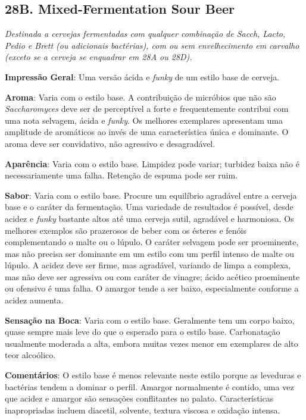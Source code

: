 \subsection*{28B. Mixed-Fermentation Sour Beer}
\textit{Destinada a cervejas fermentadas com qualquer combinação de Sacch, Lacto, Pedio e Brett (ou adicionais bactérias), com ou sem envelhecimento em carvalho (exceto se a cerveja se enquadrar em 28A ou 28D).}

\textbf{Impressão Geral}: Uma versão ácida e \textit{funky} de um estilo base de cerveja.

\textbf{Aroma}: Varia com o estilo base. A contribuição de micróbios que não são \textit{Saccharomyces} deve ser de perceptível a forte e frequentemente contribui com uma nota selvagem, ácida e \textit{funky}. Os melhores exemplares apresentam uma amplitude de aromáticos ao invés de uma característica única e dominante. O aroma deve ser convidativo, não agressivo e desagradável.

\textbf{Aparência}: Varia com o estilo base. Limpidez pode variar; turbidez baixa não é necessariamente uma falha. Retenção de espuma pode ser ruim.

\textbf{Sabor}: Varia com o estilo base. Procure um equilíbrio agradável entre a cerveja base e o caráter da fermentação. Uma variedade de resultados é possível, desde acidez e \textit{funky} bastante altos até uma cerveja sutil, agradável e harmoniosa. Os melhores exemplos são prazerosos de beber com os ésteres e fenóis complementando o malte ou o lúpulo. O caráter selvagem pode ser proeminente, mas não precisa ser dominante em um estilo com um perfil intenso de malte ou lúpulo. A acidez deve ser firme, mas agradável, variando de limpa a complexa, mas não deve ser agressiva ou com caráter de vinagre; ácido acético proeminente ou ofensivo é uma falha. O amargor tende a ser baixo, especialmente conforme a acidez aumenta.

\textbf{Sensação na Boca}: Varia com o estilo base. Geralmente tem um corpo baixo, quase sempre mais leve do que o esperado para o estilo base. Carbonatação usualmente moderada a alta, embora muitas vezes menor em exemplares de alto teor alcoólico.

\textbf{Comentários}: O estilo base é menos relevante neste estilo porque as leveduras e bactérias tendem a dominar o perfil. Amargor normalmente é contido, uma vez que acidez e amargor são sensações conflitantes no palato. Características inapropriadas incluem diacetil, solvente, textura viscosa e oxidação intensa.

